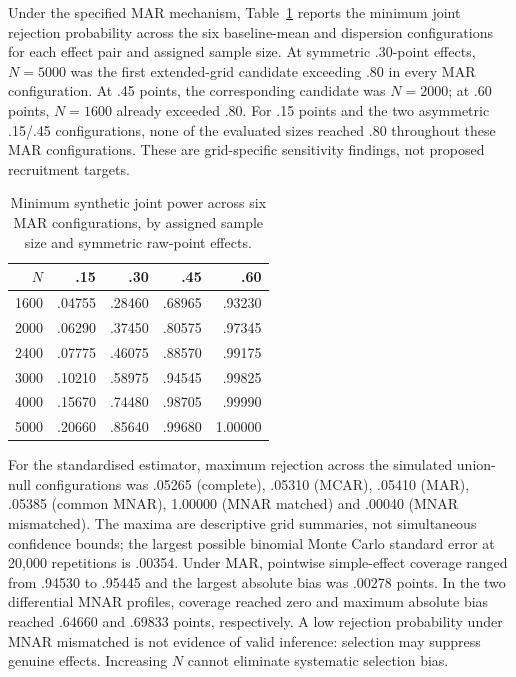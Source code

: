 Under the specified MAR mechanism, Table~\ref{tab:bounded-power} reports the minimum joint rejection probability across the six baseline-mean and dispersion configurations for each effect pair and assigned sample size. At symmetric .30-point effects, $N=5000$ was the first extended-grid candidate exceeding .80 in every MAR configuration. At .45 points, the corresponding candidate was $N=2000$; at .60 points, $N=1600$ already exceeded .80. For .15 points and the two asymmetric .15/.45 configurations, none of the evaluated sizes reached .80 throughout these MAR configurations. These are grid-specific sensitivity findings, not proposed recruitment targets.

\begin{table}[htbp]
\centering\small
\caption{Minimum synthetic joint power across six MAR configurations, by assigned sample size and symmetric raw-point effects.}
\label{tab:bounded-power}
\begin{tabular}{@{}rrrrr@{}}
\toprule
$N$ & .15 & .30 & .45 & .60\\
\midrule
1600 & .04755 & .28460 & .68965 & .93230\\
2000 & .06290 & .37450 & .80575 & .97345\\
2400 & .07775 & .46075 & .88570 & .99175\\
3000 & .10210 & .58975 & .94545 & .99825\\
4000 & .15670 & .74480 & .98705 & .99990\\
5000 & .20660 & .85640 & .99680 & 1.00000\\
\bottomrule
\end{tabular}
\end{table}

For the standardised estimator, maximum rejection across the simulated union-null configurations was .05265 (complete), .05310 (MCAR), .05410 (MAR), .05385 (common MNAR), 1.00000 (MNAR matched) and .00040 (MNAR mismatched). The maxima are descriptive grid summaries, not simultaneous confidence bounds; the largest possible binomial Monte Carlo standard error at 20,000 repetitions is .00354. Under MAR, pointwise simple-effect coverage ranged from .94530 to .95445 and the largest absolute bias was .00278 points. In the two differential MNAR profiles, coverage reached zero and maximum absolute bias reached .64660 and .69833 points, respectively. A low rejection probability under MNAR mismatched is not evidence of valid inference: selection may suppress genuine effects. Increasing $N$ cannot eliminate systematic selection bias.


